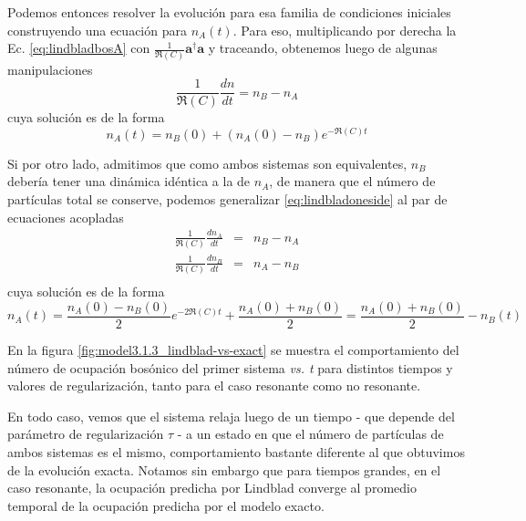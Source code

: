 \documentclass{report} %
\numberwithin{equation}{section}
\begin{document}
Podemos entonces resolver la evolución para esa familia de condiciones iniciales construyendo una ecuación para $n_A(t)$. Para eso, multiplicando por derecha la Ec. \ref{eq:lindbladbosA} con $\frac{1}{\Re(C)}{\mathbf a}^\dagger{\mathbf a}$ y traceando, obtenemos luego de algunas manipulaciones 
\begin{equation}
  \label{eq:lindbladoneside}
\frac{1}{\Re(C)}\frac{d n}{dt}= n_B-n_A
\end{equation}
cuya solución es de la forma
$$
n_{A}(t)=n_{B}(0)+(n_{A}(0)-n_{B})e^{-\Re(C)t }
$$

Si por otro lado, admitimos que como ambos sistemas son equivalentes, $n_B$ debería tener una dinámica idéntica a la de $n_A$, de manera que el número de partículas total se conserve, podemos generalizar \ref{eq:lindbladoneside} al par de ecuaciones acopladas
\begin{eqnarray}
  \label{eq:lindbladtwoside}
  \frac{1}{\Re(C)}\frac{d n_A}{dt}&=& n_B-n_A\\
  \frac{1}{\Re(C)}\frac{d n_B}{dt}&=& n_A-n_B\\
\end{eqnarray}
cuya solución es de la forma
$$
n_A(t)=\frac{n_{A}(0)-n_B(0)}{2}e^{-2 \Re(C) t} + \frac{n_{A}(0)+n_B(0)}{2}=\frac{n_{A}(0)+n_B(0)}{2}-n_{B}(t)
$$

En la figura \ref{fig:model3.1.3_lindblad-vs-exact} se muestra el comportamiento del número de ocupación bosónico del primer sistema \textit{vs. t} para distintos tiempos y valores de regularización, tanto para el caso resonante como no resonante. 

En todo caso, vemos que el sistema relaja luego de un tiempo - que depende del parámetro de regularización $\tau$ - a un estado en que el número de partículas de ambos sistemas es el mismo, comportamiento bastante diferente al que obtuvimos de la evolución exacta. Notamos sin embargo que para tiempos grandes, en el caso resonante, la ocupación predicha por Lindblad converge al promedio temporal de la ocupación predicha por el modelo exacto.
\end{document}
